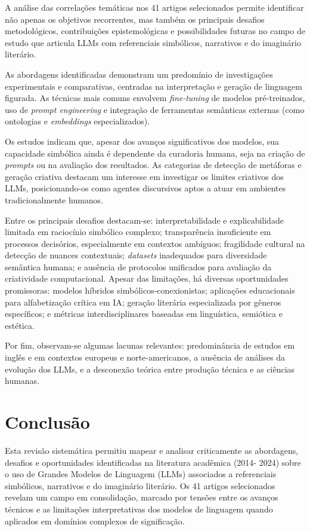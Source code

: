 \documentclass[portuguese]{textolivre}
\begin{document}
A análise das correlações temáticas nos 41 artigos selecionados permite identificar não apenas os objetivos recorrentes, mas também os principais desafios metodológicos, contribuições epistemológicas e possibilidades futuras no campo de estudo que articula LLMs com referenciais simbólicos, narrativos e do imaginário literário.

As abordagens identificadas demonstram um predomínio de investigações experimentais e comparativas, centradas na interpretação e geração de linguagem figurada. As técnicas mais comuns envolvem \textit{fine-tuning} de modelos pré-treinados, uso de \textit{prompt engineering} e integração de ferramentas semânticas externas (como ontologias e \textit{embeddings} especializados).

Os estudos indicam que, apesar dos avanços significativos dos modelos, sua capacidade simbólica ainda é dependente da curadoria humana, seja na criação de \textit{prompts} ou na avaliação dos resultados. As categorias de detecção de metáforas e geração criativa destacam um interesse em investigar os limites criativos dos LLMs, posicionando-os como agentes discursivos aptos a atuar em ambientes tradicionalmente humanos.

Entre os principais desafios destacam-se:  interpretabilidade e explicabilidade limitada em raciocínio simbólico complexo; transparência insuficiente em processos decisórios, especialmente em contextos ambíguos; fragilidade cultural na detecção de nuances contextuais; \textit{datasets} inadequados para diversidade semântica humana; e ausência de protocolos unificados para avaliação da criatividade computacional. Apesar das limitações, há diversas oportunidades promissoras: modelos híbridos simbólicos-conexionistas; aplicações educacionais para alfabetização crítica em IA; geração literária especializada por gêneros específicos; e métricas interdisciplinares baseadas em linguística, semiótica e estética.

Por fim, observam-se algumas lacunas relevantes: predominância de estudos em inglês e em contextos europeus  e norte-americanos, a ausência de análises da evolução dos LLMs, e a desconexão teórica entre produção técnica e as ciências humanas.

\section{Conclusão}
Esta revisão sistemática permitiu mapear e analisar criticamente as abordagens, desafios e oportunidades identificadas na literatura acadêmica (2014- 2024) sobre o uso de Grandes Modelos de Linguagem (LLMs) associados a referenciais simbólicos, narrativos e do imaginário literário. Os 41 artigos selecionados revelam um campo em consolidação, marcado por tensões entre os avanços técnicos e as limitações interpretativas dos modelos de linguagem quando aplicados em domínios complexos de significação.
\end{document}
